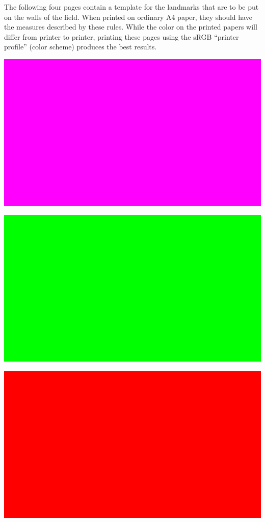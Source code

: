 \documentclass{article}
\begin{document}
The following four pages contain a template for the  landmarks that are to be put on the walls of the field. When printed on
ordinary A4 paper, they should have the measures described by these rules.
While the color on the printed papers will differ from printer to printer,
printing these pages using the sRGB ``printer profile'' (color scheme) produces
the best results.

\newpage

\includegraphics[width=1\textwidth]{media/image11.png}

\includegraphics[width=1\textwidth]{media/image12.png}

\includegraphics[width=1\textwidth]{media/image13.png}
\end{document}

